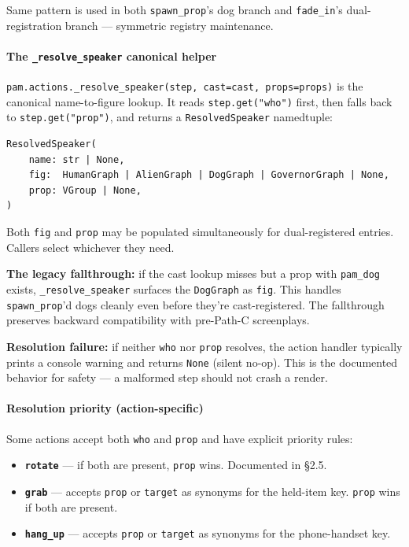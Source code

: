 \documentclass[
  11pt,
]{book}
\providecommand{\tightlist}{%
  \setlength{\itemsep}{0pt}\setlength{\parskip}{0pt}}
\begin{document}
Same pattern is used in both \texttt{spawn\_prop}'s dog branch and
\texttt{fade\_in}'s dual-registration branch --- symmetric registry
maintenance.

\paragraph{\texorpdfstring{The \texttt{\_resolve\_speaker} canonical
helper}{The \_resolve\_speaker canonical helper}}\label{the-_resolve_speaker-canonical-helper}

\texttt{pam.actions.\_resolve\_speaker(step,\ cast=cast,\ props=props)}
is the canonical name-to-figure lookup. It reads
\texttt{step.get("who")} first, then falls back to
\texttt{step.get("prop")}, and returns a \texttt{ResolvedSpeaker}
namedtuple:

\begin{verbatim}
ResolvedSpeaker(
    name: str | None,
    fig:  HumanGraph | AlienGraph | DogGraph | GovernorGraph | None,
    prop: VGroup | None,
)
\end{verbatim}

Both \texttt{fig} and \texttt{prop} may be populated simultaneously for
dual-registered entries. Callers select whichever they need.

\textbf{The legacy fallthrough:} if the cast lookup misses but a prop
with \texttt{pam\_dog} exists, \texttt{\_resolve\_speaker} surfaces the
\texttt{DogGraph} as \texttt{fig}. This handles \texttt{spawn\_prop}'d
dogs cleanly even before they're cast-registered. The fallthrough
preserves backward compatibility with pre-Path-C screenplays.

\textbf{Resolution failure:} if neither \texttt{who} nor \texttt{prop}
resolves, the action handler typically prints a console warning and
returns \texttt{None} (silent no-op). This is the documented behavior
for safety --- a malformed step should not crash a render.

\paragraph{Resolution priority
(action-specific)}\label{resolution-priority-action-specific}

Some actions accept both \texttt{who} and \texttt{prop} and have
explicit priority rules:

\begin{itemize}
\tightlist
\item
  \textbf{\texttt{rotate}} --- if both are present, \texttt{prop} wins.
  Documented in §2.5.
\item
  \textbf{\texttt{grab}} --- accepts \texttt{prop} or \texttt{target} as
  synonyms for the held-item key. \texttt{prop} wins if both are
  present.
\item
  \textbf{\texttt{hang\_up}} --- accepts \texttt{prop} or
  \texttt{target} as synonyms for the phone-handset key.
\end{itemize}
\end{document}

